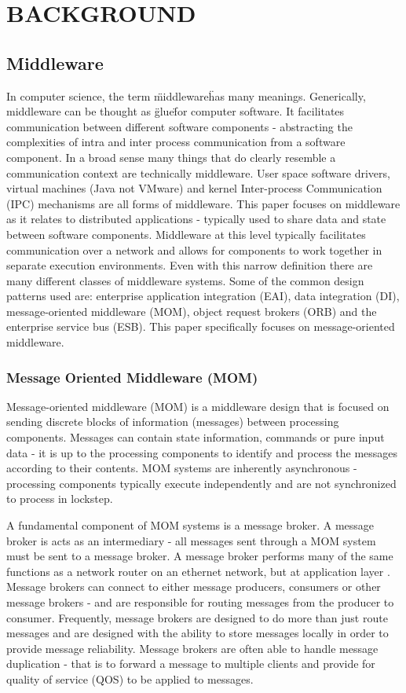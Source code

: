 \documentclass{thesis}
\begin{document}
\chapter{BACKGROUND}

\section{Middleware}
In computer science, the term \"middleware\" has many meanings.  Generically, middleware can be thought as \"glue\"  for computer software.  It facilitates communication between different software components - abstracting the complexities of intra and inter process communication from a software component.  In a broad sense many things that do clearly resemble a communication context are technically middleware.  User space software drivers, virtual machines (Java not VMware) and kernel Inter-process Communication (IPC) mechanisms are all forms of middleware.  This paper focuses on middleware as it relates to distributed applications - typically used to share data and state between software components.  Middleware at this level typically facilitates communication over a network and allows for components to work together in separate execution environments.  Even with this narrow definition there are many different classes of middleware systems.  Some of the common design patterns used are: enterprise application integration (EAI), data integration (DI), message-oriented middleware (MOM), object request brokers (ORB) and the enterprise service bus (ESB).  This paper specifically focuses on message-oriented middleware. 

\subsection{Message Oriented Middleware (MOM)}
Message-oriented middleware (MOM) is a middleware design that is focused on sending discrete blocks of information (messages) between processing components.  Messages can contain state information, commands or pure input data - it is up to the processing components to identify and process the messages according to their contents.  MOM systems are inherently asynchronous - processing components typically execute independently and are not synchronized to process in lockstep.

A fundamental component of MOM systems is a message broker.  A message broker is acts as an intermediary - all messages sent through a MOM system must be sent to a message broker.  A message broker performs many of the same functions as a network router on an ethernet network, but at application layer \cite{zimmermann1980osi}.  Message brokers can connect to either message producers, consumers or other message brokers - and are responsible for routing messages from the producer to consumer.  Frequently, message brokers are designed to do more than just route messages and are designed with the ability to store messages locally in order to provide message reliability.  Message brokers are often able to handle message duplication - that is to forward a message to multiple clients and provide for quality of service (QOS) to be applied to messages.  
\end{document}
